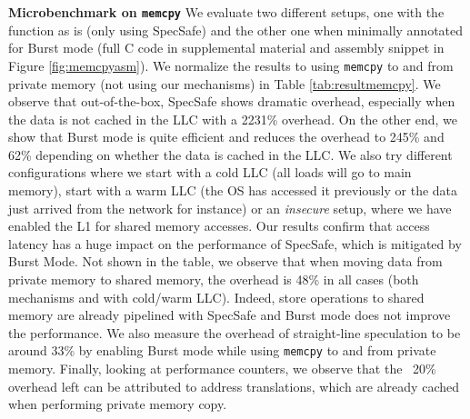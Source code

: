 \noindent\textbf{Microbenchmark on \texttt{memcpy}}
We evaluate two different setups, one with the function as is (only using SpecSafe) and the other one when minimally annotated for Burst mode (full C code in supplemental material and assembly snippet in Figure \ref{fig:memcpyasm}).
We normalize the results to using \texttt{memcpy} to and from private memory (not using our mechanisms) in Table \ref{tab:resultmemcpy}. 
We observe that out-of-the-box, SpecSafe shows dramatic overhead, especially when the data is not cached in the LLC with a 2231\% overhead.
On the other end, we show that Burst mode is quite efficient and reduces the overhead to 245\% and 62\% depending on whether the data is cached in the LLC.
We also try different configurations where we start with a cold LLC (all loads will go to main memory), start with a warm LLC (the OS has accessed it previously or the data just arrived from the network for instance) or an \emph{insecure} setup, where we have enabled the L1 for shared memory accesses.
Our results confirm that access latency has a huge impact on the performance of SpecSafe, which is mitigated by Burst Mode.
Not shown in the table, we observe that when moving data from private memory to shared memory, the overhead is 48\% in all cases (both mechanisms and with cold/warm LLC).
Indeed, store operations to shared memory are already pipelined with SpecSafe and Burst mode does not improve the performance.
We also measure the overhead of straight-line speculation to be around 33\% by enabling Burst mode while using \texttt{memcpy} to and from private memory.
Finally, looking at performance counters, we observe that the ~20\% overhead left can be attributed to address translations, which are already cached when performing private memory copy.

